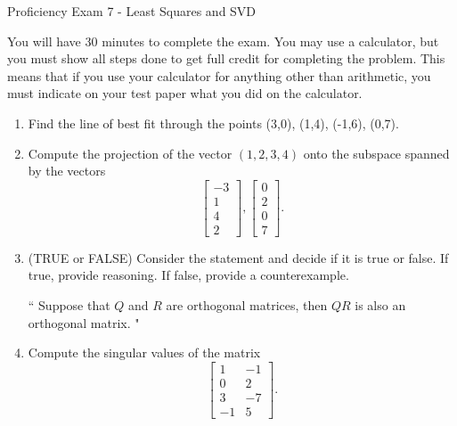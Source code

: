 \documentclass[14pt]{article}
\begin{document}
\begin{center}
Proficiency Exam 7 - Least Squares and SVD
\end{center}

You will have 30 minutes to complete the exam.  You may use a calculator, but you must show all steps done to get full credit for completing the problem.  This means that if you use your calculator for anything other than arithmetic, you must indicate on your test paper what you did on the calculator.

\begin{enumerate}

\item Find the line of best fit through the points (3,0), (1,4), (-1,6), (0,7).

\item Compute the projection of the vector $ (1,2,3,4) $ onto the subspace spanned by the vectors
\[
\left[\begin{array}{cc} -3 \\  1 \\  4 \\  2 \end{array}\right], \left[\begin{array}{cc} 0 \\  2 \\  0 \\  7 \end{array}\right].
\]

\item (TRUE or FALSE) Consider the statement and decide if it is true or false.  If true, provide reasoning.  If false, provide a counterexample.
\begin{center}
`` Suppose that $ Q $ and $ R $ are orthogonal matrices, then $ QR $ is also an orthogonal matrix. "
\end{center}

\item Compute the singular values of the matrix 
\[
\left[\begin{array}{cc} 1 & -1 \\ 0 & 2 \\ 3 & -7 \\ -1 & 5 \end{array}\right].
\]



























\end{enumerate}
\end{document}
